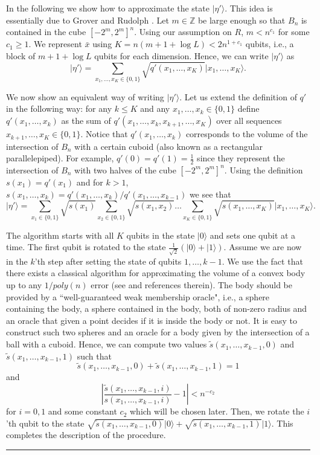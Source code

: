 \documentclass[11pt]{article}
\newcommand{\qedsymb}{\hfill{\rule{2mm}{2mm}}}
\newenvironment{proof}{\begin{trivlist}
\item[\hspace{\labelsep}{\sl\noindent Proof:\/}]
}{\qedsymb\end{trivlist}}
\def\Z{\mathbb{Z}}
\newcommand\ket[1]{{ |{#1} \rangle }}
\begin{document}
\begin{proof}
In the following we show how to approximate the state $\ket{\eta'}$. This idea is essentially due to Grover and Rudolph
\cite{GroverCreatingSuper}. Let $m\in \Z$ be large enough so that $B_n$ is contained in the cube $[-2^m, 2^m]^n$. Using
our assumption on $R$, $m<n^{c_1}$ for some $c_1 \ge 1$. We represent $\bar{x}$ using $K=n(m+1+\log L) < 2n^{1+c_1}$
qubits, i.e., a block of $m+1+\log L$ qubits for each dimension. Hence, we can write $\ket{\eta'}$ as
$$ \ket{\eta'} = \sum_{x_1,\ldots,x_K\in \{0,1\}}  \sqrt{q'(x_1,\ldots,x_K)} \ket{x_1,\ldots,x_K}.$$

We now show an equivalent way of writing $\ket{\eta'}$. Let us extend the definition of $q'$ in the following way: for
any $k\le K$ and any $x_1,\ldots, x_k \in \{0,1\}$ define $q'(x_1,\ldots,x_k)$ as the sum of
$q'(x_1,\ldots,x_k,x_{k+1},\ldots,x_K)$ over all sequences $x_{k+1},\ldots,x_K\in \{0,1\}$. Notice that
$q'(x_1,\ldots,x_k)$ corresponds to the volume of the intersection of $B_n$ with a certain cuboid (also known as a
rectangular parallelepiped). For example, $q'(0)=q'(1)=\frac{1}{2}$ since they represent the intersection of $B_n$ with
two halves of the cube $[-2^m,2^m]^n$. Using the definition $s(x_1)=q'(x_1)$ and for $k>1$,
$s(x_1,\ldots,x_k)=q'(x_1,\ldots,x_k)/q'(x_1,\ldots,x_{k-1})$ we see that
$$ \ket{\eta'} = \sum_{x_1 \in \{0,1\}} \sqrt{s(x_1)}
                 \sum_{x_2 \in \{0,1\}} \sqrt{s(x_1,x_2)} \ldots
                 \sum_{x_K \in \{0,1\}} \sqrt{s(x_1,\ldots,x_K)}
                 \ket{x_1,\ldots,x_K}.$$

The algorithm starts with all $K$ qubits in the state $\ket{0}$ and sets one qubit at a time. The first qubit is
rotated to the state $\frac{1}{\sqrt{2}} (\ket{0}+\ket{1})$. Assume we are now in the $k$'th step after setting the
state of qubits $1,\ldots,k-1$. We use the fact that there exists a classical algorithm for approximating the volume of
a convex body up to any $1/poly(n)$ error (see \cite{KannanLovaszVolume} and references therein). The body should be
provided by a ``well-guaranteed weak membership oracle", i.e., a sphere containing the body, a sphere contained in the
body, both of non-zero radius and an oracle that given a point decides if it is inside the body or not. It is easy to
construct such two spheres and an oracle for a body given by the intersection of a ball with a cuboid. Hence, we can
compute two values $\tilde{s}(x_1,\ldots,x_{k-1},0)$ and $\tilde{s}(x_1,\ldots,x_{k-1},1)$ such that
$$ \tilde{s}(x_1,\ldots,x_{k-1},0) + \tilde{s}(x_1,\ldots,x_{k-1},1) = 1$$
and
 $$ \left| \frac{\tilde{s}(x_1,\ldots,x_{k-1},i) }{ s(x_1,\ldots,x_{k-1},i)}  -  1  \right| < n^{-c_2}$$
for $i=0,1$ and some constant $c_2$ which will be chosen later. Then, we rotate the $i$'th qubit to the state
$\sqrt{\tilde{s}(x_1,\ldots,x_{k-1},0)} \ket{0} + \sqrt{\tilde{s}(x_1,\ldots,x_{k-1},1)} \ket{1}$. This completes the
description of the procedure.


\end{proof}
\end{document}
